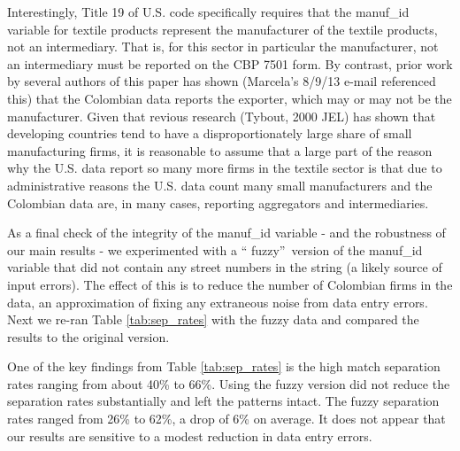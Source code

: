 Interestingly, Title 19 of U.S. code specifically requires that the
manuf\_id variable for textile products represent the manufacturer of the
textile products, not an intermediary. That is, for this sector in
particular the manufacturer, not an intermediary must be reported on the CBP
7501 form. By contrast, prior work by several authors of this paper has
shown (Marcela's 8/9/13 e-mail referenced this) that the Colombian data
reports the exporter, which may or may not be the manufacturer. Given that
revious research (Tybout, 2000 JEL) has shown that developing countries tend
to have a disproportionately large share of small manufacturing firms, it is
reasonable to assume that a large part of the reason why the U.S. data
report so many more firms in the textile sector is that due to
administrative reasons the U.S. data count many small manufacturers and the
Colombian data are, in many cases, reporting aggregators and intermediaries.

As a final check of the integrity of the manuf\_id variable - and the
robustness of our main results - we experimented with a \textquotedblleft
fuzzy\textquotedblright\ version of the manuf\_id variable that did not
contain any street numbers in the string (a likely source of input errors).
The effect of this is to reduce the number of Colombian firms in the data,
an approximation of fixing any extraneous noise from data entry errors. Next
we re-ran Table \ref{tab:sep_rates} with the fuzzy data and compared the results to the
original version.

One of the key findings from Table \ref{tab:sep_rates} is the high match separation rates
ranging from about 40\% to 66\%. Using the fuzzy version did not reduce the
separation rates substantially and left the patterns intact. The fuzzy
separation rates ranged from 26\% to 62\%, a drop of 6\% on average. It does
not appear that our results are sensitive to a modest reduction in data
entry errors.
 
